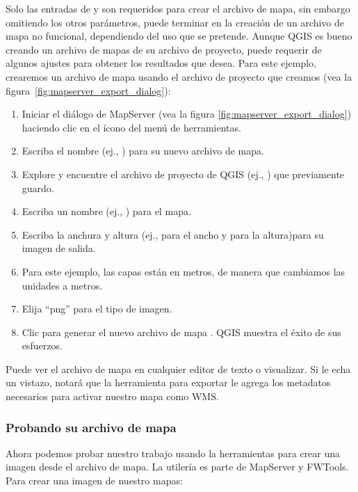 Solo las entradas de  y  son 
requeridos para crear el archivo de mapa, sin embargo omitiendo los otros parámetros, 
puede terminar en la creación de un archivo de mapa no funcional, dependiendo del uso que se pretende. 
Aunque QGIS es bueno creando un archivo de mapas de su archivo de proyecto, 
puede requerir de algunos ajustes para obtener los resultados que desea. 
Para este ejemplo, crearemos un archivo de mapa usando el archivo de proyecto 
 que creamos
(vea la figura~\ref{fig:mapserver_export_dialog}):

\begin{enumerate}
  \item  Iniciar el diálogo de MapServer (vea la  
figura \ref{fig:mapserver_export_dialog}) haciendo clic en el ícono  del menú de herramientas.
  \item Escriba el nombre (ej., ) para su nuevo archivo de mapa.
  \item Explore y encuentre el archivo de proyecto de QGIS (ej., ) 
  que previamente guardo.
  \item Escriba un nombre (ej., ) para el mapa.
  \item Escriba la anchura y altura (ej.,  para el ancho y  para la altura)para su imagen de salida.
  \item Para este ejemplo, las capas están en metros, de manera que cambiamos las unidades a metros.
  \item Elija ``png'' para el tipo de imagen.
  \item Clic  para generar el nuevo archivo de mapa . 
  QGIS muestra el éxito de sus esfuerzos.
\end{enumerate}

Puede ver el archivo de mapa en cualquier editor de texto o visualizar. Si le echa un vistazo,
notará que la herramienta para exportar le agrega los metadatos necesarios
para activar nuestro mapa como WMS. 

\subsubsection{Probando su archivo de mapa}

Ahora podemos probar nuestro trabajo usando la herramientas  para crear una imagen desde el archivo de mapa. La utilería  es parte de MapServer y FWTools. 
Para crear una imagen de nuestro mapas:

